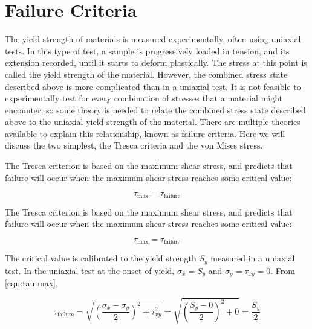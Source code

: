 \section{Failure Criteria}

The yield strength of materials is measured experimentally, often using uniaxial tests. In this type of test, a sample is progressively loaded in tension, and its extension recorded, until it starts to deform plastically. The stress at this point is called the yield strength of the material. However, the combined stress state described above is more complicated than in a uniaxial test. It is not feasible to experimentally test for every combination of stresses that a material might encounter, so some theory is needed to relate the combined stress state described above to the uniaxial yield strength of the material. There are multiple theories available to explain this relationship, known as failure criteria. Here we will discuss the two simplest, the Tresca criteria and the von Mises stress.

The Tresca criterion is based on the maximum shear stress, and predicts that failure will occur when the maximum shear stress reaches some critical value:

\begin{equation}
  \tau_{\max} = \tau_{\text{failure}}
\end{equation}

The Tresca criterion is based on the maximum shear
stress, and predicts that failure will occur when the maximum shear stress
reaches some critical value:

\begin{equation}
\label{eq:2}
\tau_\mathrm{max} = \tau_\mathrm{failure}
\end{equation}

The critical value is calibrated to the yield strength $S_y$ measured in a
uniaxial test. In the uniaxial test at the onset of yield, $\sigma_x = S_y$ and
$\sigma_y = \tau_{xy} = 0$. From \cref{equ:tau-max},

\begin{equation}
\label{eq:4}
\tau_\mathrm{failure} = \sqrt{\left(\frac{\sigma_x-\sigma_y}{2}\right)^2+\tau_{xy}^2} = \sqrt{\left(\frac{S_y-0}{2}\right)^2+0} = \frac{S_y}{2}
\end{equation}

